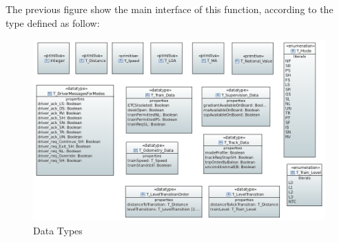 The previous figure show the main interface of this function, according to the type defined as follow:

\begin{landscape}
\begin{figure}[hbtp]
\centering
\includegraphics[scale=0.9]{../SysML/DataTypes.png}
\caption{Data Types}
\end{figure}
\end{landscape}

